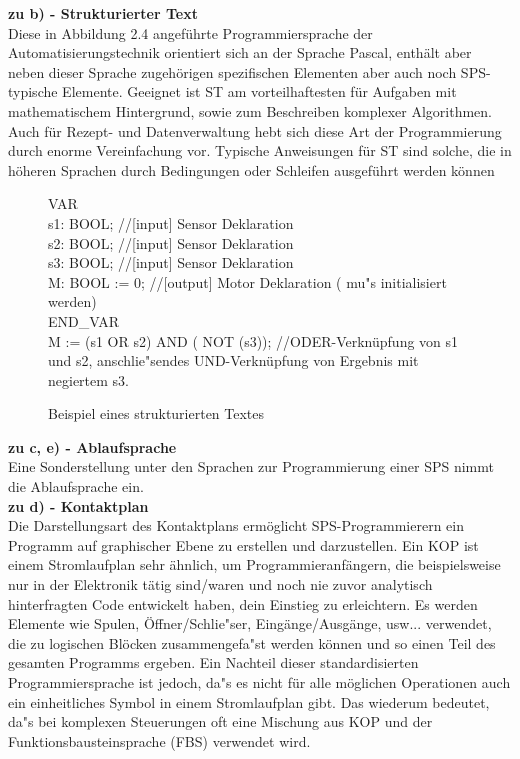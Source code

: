 	\color{black}
	\textbf{zu b) - Strukturierter Text}\\
	
	Diese in Abbildung 2.4 angeführte Programmiersprache der Automatisierungstechnik orientiert sich an der Sprache Pascal, enthält aber neben dieser Sprache zugehörigen spezifischen Elementen aber auch noch SPS-typische Elemente. Geeignet ist ST am vorteilhaftesten für Aufgaben mit mathematischem Hintergrund, sowie zum Beschreiben komplexer Algorithmen. Auch für Rezept- und Datenverwaltung hebt sich diese Art der Programmierung durch enorme Vereinfachung vor. Typische Anweisungen für ST sind solche, die in höheren Sprachen durch Bedingungen oder Schleifen ausgeführt werden können \cite{grundlagen_automatisierungstechnik}\\
	
	\begin{figure}[h]
		\begin{framed}
		\color{black}
		VAR\\
		s1: BOOL; \color{gray}//[input] Sensor Deklaration\\ \color{black}
		s2: BOOL; \color{gray}//[input] Sensor Deklaration\\ \color{black}
		s3: BOOL; \color{gray}//[input] Sensor Deklaration\\ \color{black}
		M: BOOL := 0; \color{gray}//[output] Motor Deklaration ( mu"s initialisiert werden)\\ \color{black}
		END\_VAR\\
		M := (s1 OR s2) AND ( NOT (s3)); \color{gray}//ODER-Verknüpfung von s1 und s2, anschlie"sendes UND-Verknüpfung von Ergebnis mit negiertem s3.\
		\end{framed}
		\caption{Beispiel eines strukturierten Textes}
	\end{figure}
	
	\color{black}
	\textbf{zu c, e) - Ablaufsprache}\\
	
	Eine Sonderstellung unter den Sprachen zur Programmierung einer SPS nimmt die Ablaufsprache ein. \\
	\todo[inline]{Ablaufsprache noch genauer beschreiben!}
	\textbf{zu d) - Kontaktplan}\\
	Die Darstellungsart des Kontaktplans ermöglicht SPS-Programmierern ein Programm auf graphischer Ebene zu erstellen und darzustellen. Ein KOP ist einem Stromlaufplan sehr ähnlich, um Programmieranfängern, die beispielsweise nur in der Elektronik tätig sind/waren und noch nie zuvor analytisch hinterfragten Code entwickelt haben, dein Einstieg zu erleichtern. Es werden Elemente wie Spulen, Öffner/Schlie"ser, Eingänge/Ausgänge, usw... verwendet, die zu logischen Blöcken zusammengefa"st werden können und so einen Teil des gesamten Programms ergeben. Ein Nachteil dieser standardisierten Programmiersprache ist jedoch, da"s es nicht für alle möglichen Operationen auch ein einheitliches Symbol in einem Stromlaufplan gibt. Das wiederum bedeutet, da"s bei komplexen Steuerungen oft eine Mischung aus KOP und der Funktionsbausteinsprache (FBS) verwendet wird.\\
	
